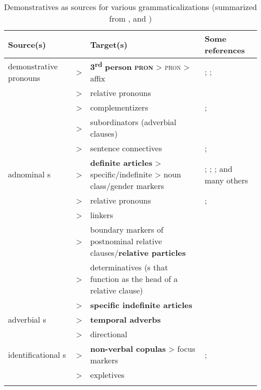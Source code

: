 \documentclass[output=paper]{langsci/langscibook}
\begin{document}
\begin{table}
\caption{Demonstratives as sources for various grammaticalizations (summarized from \citealt[Chapter 4]{Diessel1999}, and  \citealt{Heine2002})}

\small
\begin{tabularx}{\textwidth}{p{2cm}@{ }l@{ }QQ}
\lsptoprule
Source(s) &  & Target(s) & Some references\\
\midrule
de\-mon\-stra\-tive pronouns & > & \textbf{3}\textbf{\textsuperscript{rd}}\textbf{ person} \textbf{\scshape pron} >  \textsc{pron} > affix & \citet[353--360]{Givón1984}; \citet[39--42]{Lehmann1995[1982]}; \citet[112]{Heine2002}\\
& > & relative pronouns & \citet{Lehmann1984}\\
\tablevspace & > & complementizers & \citet[287]{HarrisCampbell1995}; \citet[106]{Heine2002}\\
\tablevspace & > & subordinators (adverbial clauses) &  \citet[114]{Heine2002}\\
\tablevspace & > & sentence connectives & \citet[125]{Diessel1999}; \citet[108]{Heine2002}\\
adnominal s & > & \textbf{definite articles} > specific\slash indefinite > noun class\slash gender markers & \citet{Greenberg1978}; \citet[38, 55]{Lehmann1995[1982]}; \citet[109]{Heine2002}; and many others\\
& > & relative pronouns & \citet[378--383]{Lehmann1984}; \citet[113]{Heine2002}\\
\tablevspace & > & linkers & \citet[172--188]{Himmelmann1997}\\
\tablevspace & > & boundary markers of postnominal relative clauses\slash\textbf{relative particles} & \citet[132]{Diessel1999}\\
\tablevspace & > & determinatives (s that function as the head of a relative clause) & \citet[217]{QuirkEtAl1972}\\
\tablevspace & > & \textbf{specific indefinite articles} & \citet{GundelEtAl1993}\\
adverbial s & > & \textbf{temporal adverbs} & \citet[139]{Diessel1999}\\
& > & directional  & \citet[97--104]{Lehmann1995[1982]}\\
iden\-ti\-fi\-ca\-tio\-nal s & > & \textbf{non-verbal copulas} > focus markers & \citet[147--148]{Diessel1999}; \citet[108, 111]{Heine2002}\\
& > & expletives & \citet[216--219]{Traugott1992}\\
\tablevspace
\lspbottomrule
\label{tab:helmbrecht:1}
\end{tabularx}
\end{table}
\end{document}
